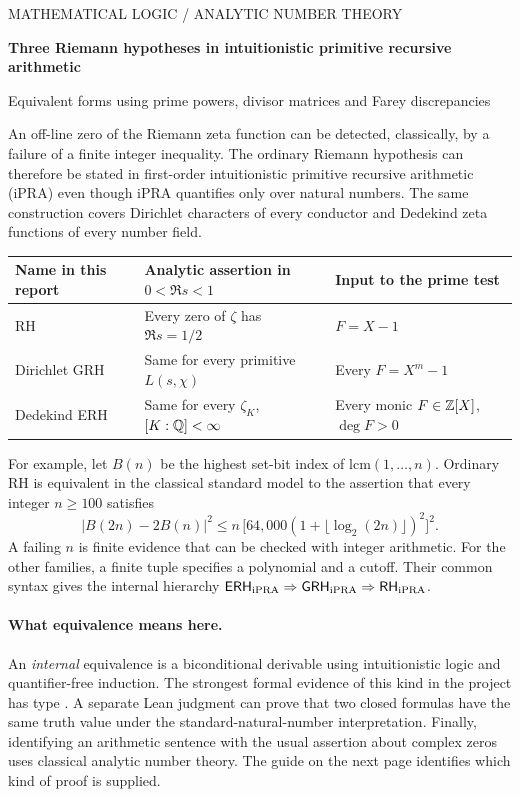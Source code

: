 \thispagestyle{plain}
{\sffamily\small\textcolor{accent}{MATHEMATICAL LOGIC \enspace / \enspace ANALYTIC NUMBER THEORY}}\par
\vspace{9pt}
{\LARGE\bfseries\color{ink} Three Riemann hypotheses in intuitionistic primitive recursive arithmetic\par}
\vspace{6pt}
{\large Equivalent forms using prime powers, divisor matrices and Farey discrepancies\par}
\vspace{7pt}{\small November 20, 2026}\par
\bigskip
An off-line zero of the Riemann zeta function can be detected, classically, by a failure of a finite integer inequality. The ordinary Riemann hypothesis can therefore be stated in first-order intuitionistic primitive recursive arithmetic (iPRA) even though iPRA quantifies only over natural numbers. The same construction covers Dirichlet characters of every conductor and Dedekind zeta functions of every number field.

\begin{center}\small
\begin{tabular}{@{}lll@{}}\toprule
Name in this report & Analytic assertion in $0<\Re s<1$ & Input to the prime test\\\midrule
RH & Every zero of $\zeta$ has $\Re s=1/2$ & $F=X-1$\\
Dirichlet GRH & Same for every primitive $L(s,\chi)$ & Every $F=X^m-1$\\
Dedekind ERH & Same for every $\zeta_K$, $[K:\mathbb Q]<\infty$ & Every monic $F\in\mathbb Z[X]$, $\deg F>0$\\\bottomrule
\end{tabular}
\end{center}
\noindent
For example, let $B(n)$ be the highest set-bit index of $\mathrm{lcm}(1,\ldots,n)$. Ordinary RH is equivalent in the classical standard model to the assertion that every integer $n\ge100$ satisfies
\[
 |B(2n)-2B(n)|^2\le n\,\bigl[64{,}000(1+\lfloor\log_2(2n)\rfloor)^2\bigr]^2 .
\]
A failing $n$ is finite evidence that can be checked with integer arithmetic. For the other families, a finite tuple specifies a polynomial and a cutoff. Their common syntax gives the internal hierarchy $\mathsf{ERH}_{\mathrm{iPRA}}\Rightarrow\mathsf{GRH}_{\mathrm{iPRA}}\Rightarrow\mathsf{RH}_{\mathrm{iPRA}}$.

\paragraph{What equivalence means here.}
An \emph{internal} equivalence is a biconditional derivable using intuitionistic logic and quantifier-free induction. The strongest formal evidence of this kind in the project has type . A separate Lean judgment can prove that two closed formulas have the same truth value under the standard-natural-number interpretation. Finally, identifying an arithmetic sentence with the usual assertion about complex zeros uses classical analytic number theory. The guide on the next page identifies which kind of proof is supplied.

